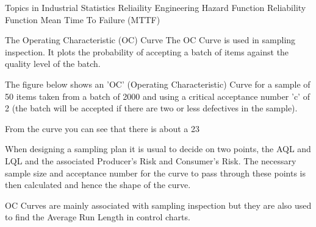  
Topics in Industrial Statistics
Reliaility Engineering
Hazard Function
Reliability Function
Mean Time To Failure (MTTF)
 

The Operating Characteristic (OC) Curve
The OC Curve is used in sampling inspection. It plots the probability of accepting a batch of items against the quality level of the batch.
 
The figure below shows an 'OC' (Operating Characteristic) Curve for a sample of 50 items taken from a batch of 2000 and using a critical acceptance number 'c' of 2 (the batch will be accepted if there are two or less defectives in the sample).
 
From the curve you can see that there is about a 23%

When designing a sampling plan it is usual to decide on two points, the AQL and LQL and the associated Producer's Risk and Consumer's Risk. The necessary sample size and acceptance number for the curve to pass through these points is then calculated and hence the shape of the curve.
 
OC Curves are mainly associated with sampling inspection but they are also used to find the Average Run Length in control charts.

 
 
